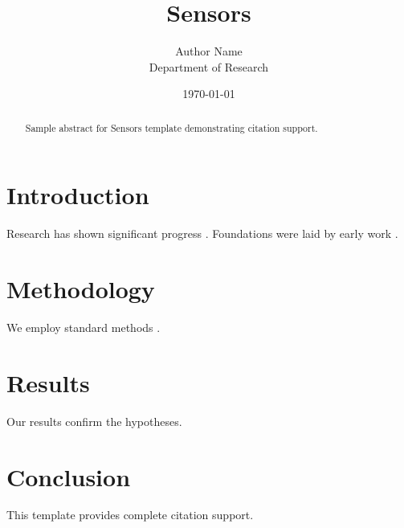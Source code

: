 \documentclass{mdpi}
\title{Sensors}
\author{Author Name \\ \small Department of Research}
\date{\today}
\begin{document}
\maketitle

\begin{abstract}
Sample abstract for Sensors template demonstrating citation support.
\end{abstract}

\section{Introduction}
Research has shown significant progress \citep{einstein1905}. Foundations were laid by early work \citep{turing1950}.

\section{Methodology}
We employ standard methods \citep{knuth1984}.

\section{Results}
Our results confirm the hypotheses.

\section{Conclusion}
This template provides complete citation support.



\end{document}
